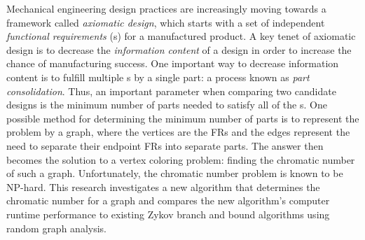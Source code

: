 Mechanical engineering design practices are increasingly moving towards a framework called \emph{axiomatic design},
which starts with a set of independent \emph{functional requirements} ({\FR}s) for a manufactured product.  A key
tenet of axiomatic design is to decrease the \emph{information content} of a design in order to increase the chance
of manufacturing success.  One important way to decrease information content is to fulfill multiple {\FR}s by a
single part: a process known as \emph{part consolidation}.  Thus, an important parameter when comparing two
candidate designs is the minimum number of parts needed to satisfy all of the {\FR}s.  One possible method for
determining the minimum number of parts is to represent the problem by a graph, where the vertices are the FRs and
the edges represent the need to separate their endpoint FRs into separate parts.  The answer then becomes the
solution to a vertex coloring problem: finding the chromatic number of such a graph.  Unfortunately, the chromatic
number problem is known to be NP-hard.  This research investigates a new algorithm that determines the chromatic
number for a graph and compares the new algorithm's computer runtime performance to existing Zykov branch
and bound algorithms using random graph analysis.
